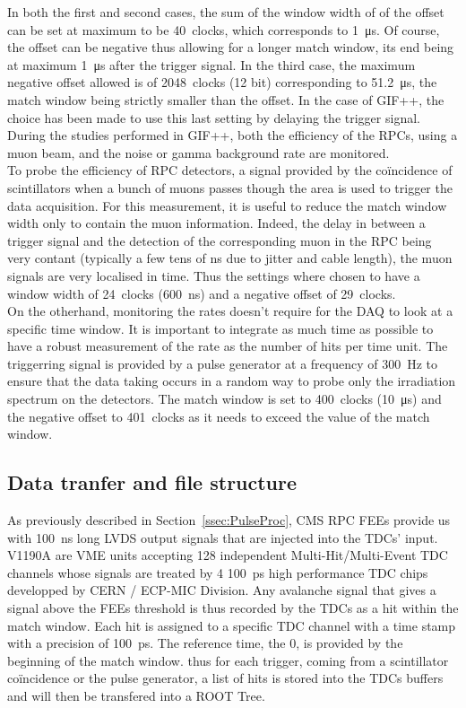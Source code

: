 	In both the first and second cases, the sum of the window width of of the offset can be set at maximum to be \SI{40}{clocks}, which corresponds to \SI{1}{\micro s}. Of course, the offset can be negative thus allowing for a longer match window, its end being at maximum \SI{1}{\micro s} after the trigger signal. In the third case, the maximum negative offset allowed is of \SI{2048}{clocks} (12 bit) corresponding to \SI{51.2}{\micro s}, the match window being strictly smaller than the offset. In the case of GIF++, the choice has been made to use this last setting by delaying the trigger signal. During the studies performed in GIF++, both the efficiency of the RPCs, using a muon beam, and the noise or gamma background rate are monitored.\\
	To probe the efficiency of RPC detectors, a signal provided by the coïncidence of scintillators when a bunch of muons passes though the area is used to trigger the data acquisition. For this measurement, it is useful to reduce the match window width only to contain the muon information. Indeed, the delay in between a trigger signal and the detection of the corresponding muon in the RPC being very contant (typically a few tens of ns due to jitter and cable length), the muon signals are very localised in time. Thus the settings where chosen to have a window width of \SI{24}{clocks} (\SI{600}{ns}) and a negative offset of \SI{29}{clocks}.\\
	On the otherhand, monitoring the rates doesn't require for the DAQ to look at a specific time window. It is important to integrate as much time as possible to have a robust measurement of the rate as the number of hits per time unit. The triggerring signal is provided by a pulse generator at a frequency of \SI{300}{Hz} to ensure that the data taking occurs in a random way to probe only the irradiation spectrum on the detectors. The match window is set to \SI{400}{clocks} (\SI{10}{\micro s}) and the negative offset to \SI{401}{clocks} as it needs to exceed the value of the match window.\\
	
	\subsection{Data tranfer and file structure}
	\label{app1:ssec:BLT}
	
	As previously described in Section~\ref{ssec:PulseProc}, CMS RPC FEEs provide us with \SI{100}{ns} long LVDS output signals that are injected into the TDCs' input. V1190A are VME units accepting 128 independent Multi-Hit/Multi-Event TDC channels whose signals are treated by 4 \SI{100}{ps} high performance TDC chips developped by CERN / ECP-MIC Division. Any avalanche signal that gives a signal above the FEEs threshold is thus recorded by the TDCs as a hit within the match window. Each hit is assigned to a specific TDC channel with a time stamp with a precision of \SI{100}{ps}. The reference time, the 0, is provided by the beginning of the match window. thus for each trigger, coming from a scintillator coïncidence or the pulse generator, a list of hits is stored into the TDCs buffers and will then be transfered into a ROOT Tree.\\
	
